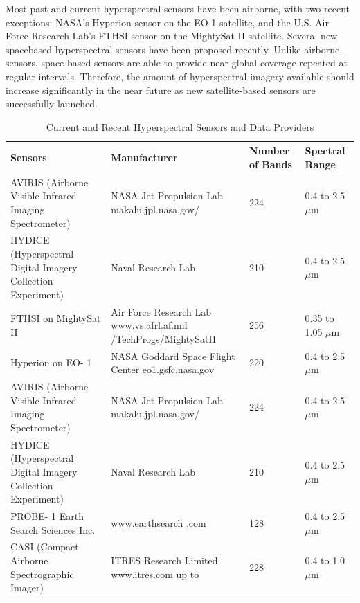 \documentclass[document.tex]{subfiles}
\begin{document}
\noindent Most past and current hyperspectral sensors have been airborne, with two
recent exceptions: NASA’s Hyperion sensor on the EO-1 satellite, and the U.S. Air
Force Research Lab’s FTHSI sensor on the MightySat II satellite. Several new spacebased
hyperspectral sensors have been proposed recently. Unlike airborne
sensors, space-based sensors are able to provide near global coverage repeated at regular
intervals. Therefore, the amount of hyperspectral imagery available should increase
significantly in the near future as new satellite-based sensors are successfully launched.
\begin{table}[H]
	\caption{Current and Recent Hyperspectral Sensors and Data Providers}
	\begin{center}
		\begin{tabularx}{\columnwidth}{|X|X|X|X|}
			\hline
			Sensors & Manufacturer & Number of
			Bands &
			Spectral Range\\ \hline
			
			AVIRIS
			(Airborne
			Visible
			Infrared
			Imaging
			Spectrometer) &
			NASA Jet
			Propulsion Lab
			makalu.jpl.nasa.gov/ &
			224 & 0.4 to 2.5 $\mu$m\\ \hline
			
			HYDICE
			(Hyperspectral
			Digital
			Imagery
			Collection
			Experiment) &
			Naval Research Lab & 210 & 0.4 to 2.5 $\mu$m \\ \hline
			
			FTHSI on
			MightySat
			II &
			Air Force Research
			Lab www.vs.afrl.af.mil
			/TechProgs/MightySatII &
			256  & 0.35 to 1.05 $\mu$m \\ \hline
			Hyperion
			on EO- 1 &
			NASA Goddard
			Space Flight Center
			eo1.gsfc.nasa.gov &
			220 & 0.4 to 2.5 $\mu$m\\ \hline
			
			AVIRIS
			(Airborne
			Visible
			Infrared
			Imaging
			Spectrometer) &
			NASA Jet
			Propulsion Lab
			makalu.jpl.nasa.gov/ &
			224 & 0.4 to 2.5 $\mu$m\\ \hline
			
			HYDICE
			(Hyperspectral
			Digital
			Imagery
			Collection
			Experiment) &
			Naval Research Lab & 210 & 0.4 to 2.5 $\mu$m \\ \hline
			
			PROBE-
			1 Earth
			Search
			Sciences
			Inc. &
			www.earthsearch .com & 128 & 0.4 to 2.5 $\mu$m\\ \hline
			
			CASI (Compact
			Airborne
			Spectrographic
			Imager) &
			ITRES Research Limited
			www.itres.com
			up to  & 228 & 0.4 to 1.0$\mu$m\\ \hline
		\end{tabularx}
	\end{center}
	\label{tab:Current and Recent Hyperspectral Sensors and Data Providers}
\end{table}
\clearpage
\end{document}
